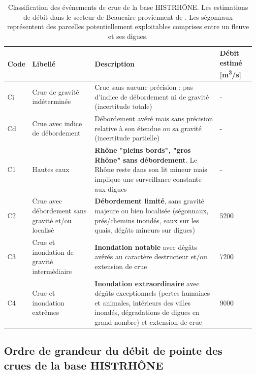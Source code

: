 \begin{table}[h]
	\centering
	\caption{Classification des événements de crue de la base HISTRHÔNE. Les estimations de débit dans le secteur de Beaucaire proviennent de \citet{pichard_hydro-climatology_2017}. Les ségonnaux représentent des parcelles potentiellement exploitables comprises entre un fleuve et ses digues.}
	\label{tab:CatCrueHistrhone}
		\begin{tabular}{|m{0.8cm}|m{3.6cm}|m{7.6cm}|m{3cm}|}
		\hline
		Code &
		  Libellé &
		  Description &
		  Débit estimé [m\textsuperscript{3}/s] \\ \hline
		Ci &
		  Crue de gravité indéterminée &
		  Crue sans aucune précision : pas d'indice de débordement ni de gravité (incertitude totale) &
		  - \\ \hline
		Cd &
		  Crue avec indice de débordement &
		  Débordement avéré mais sans précision relative à son étendue ou sa gravité (incertitude partielle) &
		  - \\ \hline
		C1 &
		  Hautes eaux &
		  
\textbf{Rhône "pleins bords", "gros Rhône" sans débordement}. Le Rhône reste dans son lit mineur mais implique une surveillance constante aux digues &
		  - \\ \hline
		C2 &
		  Crue avec débordement sans gravité et/ou localisé &
		 
\textbf{Débordement limité}, sans gravité majeure ou bien localisée (ségonnaux, prés/chemins inondés, eaux sur les quais, dégâts mineurs sur digues) &
		 5200 \\ \hline
		C3 &
		  Crue et inondation de gravité intermédiaire &
		  
\textbf{Inondation notable} avec dégâts avérés au caractère destructeur et/ou extension de crue &
		  7200 \\ \hline
		C4 &
		  Crue et inondation extrêmes &
\textbf{Inondation extraordinaire} avec dégâts exceptionnels (pertes humaines et animales, intérieurs des villes inondés, dégradations de digues en grand nombre) et extension de crue &
		  9000 \\ \hline
		\end{tabular}
\end{table}
	
\FloatBarrier

	\subsection{Ordre de grandeur du débit de pointe des crues de la base HISTRHÔNE}
	
